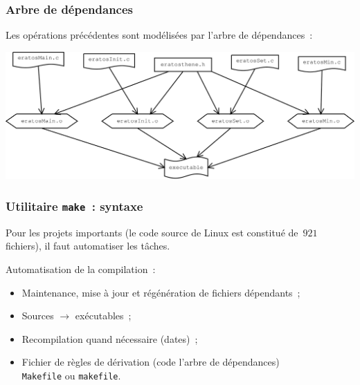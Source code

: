 \begin{frame}
\frametitle{Arbre de d\'ependances}
Les op\'erations pr\'ec\'edentes sont mod\'elis\'ees par
l'arbre de d\'ependances~: 
\par\bigskip
\includegraphics[scale=.2]{arbre}
\end{frame}
\begin{frame}[fragile]
  \frametitle{Utilitaire {\tt make}~: syntaxe}%
  Pour les projets importants (le code source de Linux est constitu\'e
  de~$921$ fichiers), il faut automatiser les t\^aches.
  \par\medskip
  Automatisation de la compilation~:
  \begin{itemize}
  \item Maintenance, mise \`a jour et r\'eg\'en\'eration de fichiers
    d\'ependants~;
  \item Sources $\rightarrow$ ex\'ecutables~;
  \item Recompilation quand n\'ecessaire (dates)~; 
  \item Fichier de r\`egles de d\'erivation (code l'arbre de d\'ependances)\\
    \hspace*{10mm} {\tt Makefile} ou {\tt makefile}.
  \end{itemize}   
\end{frame}
